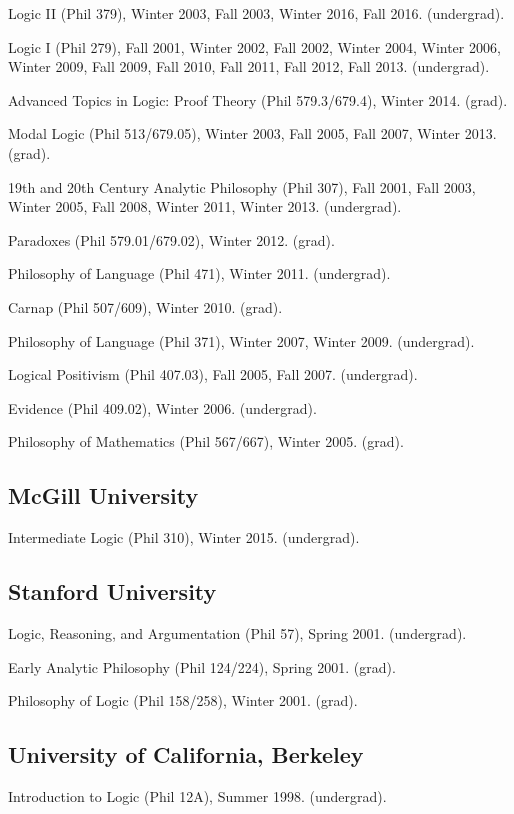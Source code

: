 \documentclass[11pt]{article}
\begin{document}
\ind Logic II (Phil 379), Winter 2003, Fall 2003, Winter 2016, Fall 2016. (undergrad).

\ind Logic I (Phil 279), Fall 2001, Winter 2002, Fall 2002, Winter 2004, Winter 2006, Winter
2009, Fall 2009, Fall 2010, Fall 2011, Fall 2012, Fall 2013. (undergrad).

\ind Advanced Topics in Logic: Proof Theory (Phil 579.3/679.4), Winter 2014. (grad).

\ind Modal Logic (Phil 513/679.05), Winter 2003, Fall 2005, Fall 2007, Winter 2013. (grad).

\ind 19th and 20th Century Analytic Philosophy (Phil 307), Fall 2001, Fall 2003, Winter 2005, Fall 2008, Winter 2011, Winter 2013. (undergrad).

\ind Paradoxes (Phil 579.01/679.02), Winter 2012. (grad).

\ind Philosophy of Language (Phil 471), Winter 2011. (undergrad).

\ind Carnap (Phil 507/609), Winter 2010. (grad).

\ind Philosophy of Language (Phil 371), Winter 2007, Winter 2009. (undergrad).

\ind Logical Positivism (Phil 407.03), Fall 2005, Fall 2007. (undergrad).

\ind Evidence (Phil 409.02), Winter 2006. (undergrad).

\ind Philosophy of Mathematics (Phil 567/667), Winter 2005. (grad).

\subsection{McGill University}
\ind Intermediate Logic (Phil 310), Winter 2015. (undergrad).

\subsection{Stanford University}
\ind Logic, Reasoning, and Argumentation (Phil 57), Spring 2001. (undergrad).

\ind Early Analytic Philosophy (Phil 124/224), Spring 2001. (grad).

\ind Philosophy of Logic (Phil 158/258), Winter 2001. (grad).

\subsection{University of California, Berkeley}
\ind Introduction to Logic (Phil 12A), Summer 1998. (undergrad).
\end{document}
